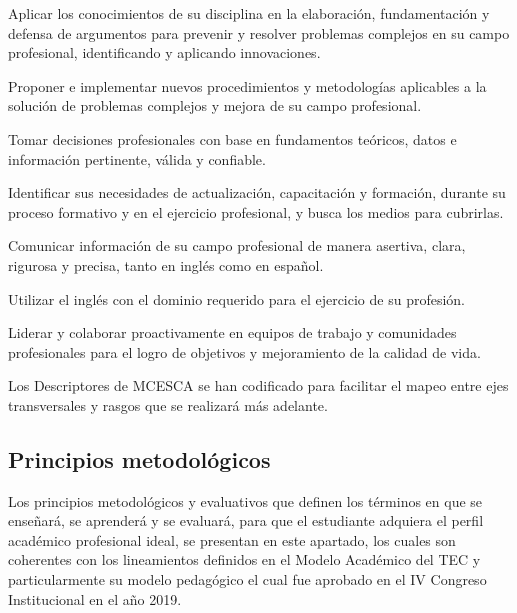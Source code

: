 \begin{cuadrocafe}[MCA04]
Aplicar los conocimientos de su disciplina en la elaboración, fundamentación y defensa de argumentos para prevenir y resolver problemas complejos en su campo profesional, identificando y aplicando innovaciones.
\end{cuadrocafe}

\begin{cuadrocafe}[MCA05]
Proponer e implementar nuevos procedimientos y metodologías aplicables a la solución de problemas complejos y mejora de su campo profesional.
\end{cuadrocafe}

\begin{cuadrocafe}[MCA06]
Tomar decisiones profesionales con base en fundamentos teóricos, datos e información pertinente, válida y confiable.
\end{cuadrocafe}

\begin{cuadrocafe}[MCA07]
Identificar sus necesidades de actualización, capacitación y formación, durante su proceso formativo y en el ejercicio profesional, y busca los medios para cubrirlas.
\end{cuadrocafe}

\begin{cuadrocafe}[MCA08]
Comunicar información de su campo profesional de manera asertiva, clara, rigurosa y precisa, tanto en inglés como en español.
\end{cuadrocafe}

\begin{cuadrocafe}[MCA09]
Utilizar el inglés con el dominio requerido para el ejercicio de su profesión.
\end{cuadrocafe}

\begin{cuadrocafe}[MCA10]
Liderar y colaborar proactivamente en equipos de trabajo y comunidades profesionales para el logro de objetivos y mejoramiento de la calidad de vida.
\end{cuadrocafe}

Los Descriptores de MCESCA se han codificado para facilitar el mapeo entre ejes transversales y rasgos que se realizará más adelante.\par

\subsection*{Principios metodológicos}

Los principios metodológicos y evaluativos que definen los términos en que se enseñará, se aprenderá y se evaluará, para que el estudiante adquiera el perfil académico profesional ideal, se presentan en este apartado, los cuales son coherentes con los lineamientos definidos en el Modelo Académico del TEC y particularmente su modelo pedagógico el cual fue aprobado en el IV Congreso Institucional en el año 2019.\par

